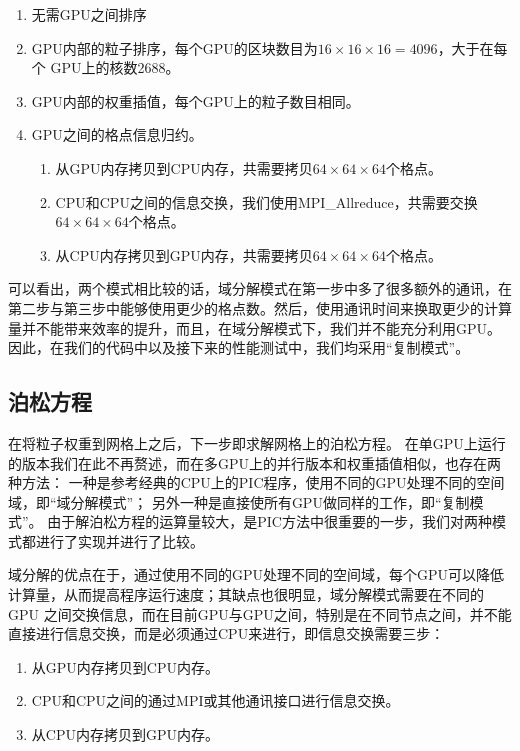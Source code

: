 \begin{enumerate}
  \item 无需GPU之间排序
  \item GPU内部的粒子排序，每个GPU的区块数目为$16 \times 16 \times 16 = 4096$，大于在每个 GPU上的核数2688。
  \item GPU内部的权重插值，每个GPU上的粒子数目相同。
  \item GPU之间的格点信息归约。
  \begin{enumerate}
    \item 从GPU内存拷贝到CPU内存，共需要拷贝$64 \times 64 \times 64$个格点。
    \item CPU和CPU之间的信息交换，我们使用MPI\_Allreduce，共需要交换 $64 \times 64 \times 64$个格点。
    \item 从CPU内存拷贝到GPU内存，共需要拷贝$64 \times 64 \times 64$个格点。
  \end{enumerate}
\end{enumerate}

可以看出，两个模式相比较的话，域分解模式在第一步中多了很多额外的通讯，在第二步与第三步中能够使用更少的格点数。然后，使用通讯时间来换取更少的计算量并不能带来效率的提升，而且，在域分解模式下，我们并不能充分利用GPU。因此，在我们的代码中以及接下来的性能测试中，我们均采用“复制模式”。

\subsection{泊松方程}
\label{section:PIC_GPU_Poisson}
在将粒子权重到网格上之后，下一步即求解网格上的泊松方程。
在单GPU上运行的版本我们在此不再赘述，而在多GPU上的并行版本和权重插值相似，也存在两种方法：
一种是参考经典的CPU上的PIC程序，使用不同的GPU处理不同的空间域，即“域分解模式”；
另外一种是直接使所有GPU做同样的工作，即“复制模式”。
由于解泊松方程的运算量较大，是PIC方法中很重要的一步，我们对两种模式都进行了实现并进行了比较。

域分解的优点在于，通过使用不同的GPU处理不同的空间域，每个GPU可以降低计算量，从而提高程序运行速度；其缺点也很明显，域分解模式需要在不同的GPU 之间交换信息，而在目前GPU与GPU之间，特别是在不同节点之间，并不能直接进行信息交换，而是必须通过CPU来进行，即信息交换需要三步：
\begin{enumerate}
  \item 从GPU内存拷贝到CPU内存。
  \item CPU和CPU之间的通过MPI或其他通讯接口进行信息交换。
  \item 从CPU内存拷贝到GPU内存。
\end{enumerate}

